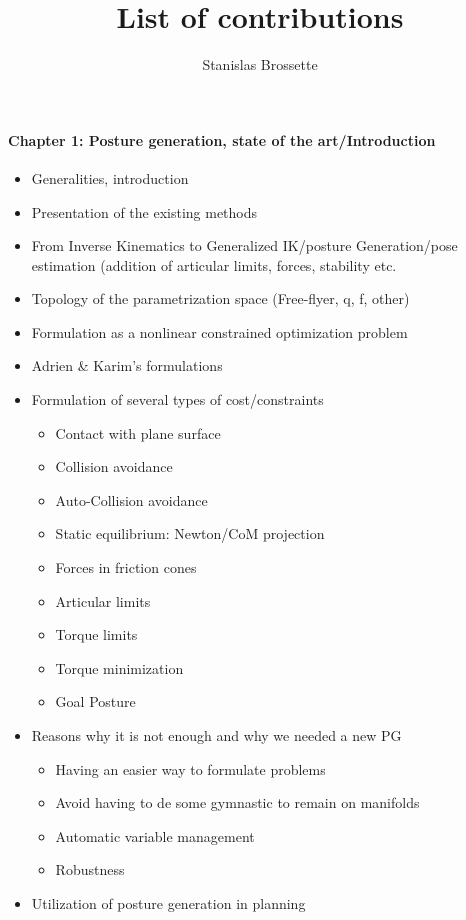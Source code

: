 \documentclass{article}
\begin{document}
\title{List of contributions}
\author{Stanislas Brossette}

\maketitle



\paragraph {Chapter 1: Posture generation, state of the art/Introduction}
\begin{itemize}
  \item Generalities, introduction
  \item Presentation of the existing methods
  \item From Inverse Kinematics to Generalized IK/posture Generation/pose estimation (addition of articular limits, forces, stability etc.
  \item Topology of the parametrization space (Free-flyer, q, f, other)
  \item Formulation as a nonlinear constrained optimization problem
  \item Adrien \& Karim's formulations
  \item Formulation of several types of cost/constraints
  \begin{itemize}
    \item Contact with plane surface
    \item Collision avoidance
    \item Auto-Collision avoidance
    \item Static equilibrium: Newton/CoM projection
    \item Forces in friction cones
    \item Articular limits
    \item Torque limits
    \item Torque minimization
    \item Goal Posture
  \end{itemize}
  \item Reasons why it is not enough and why we needed a new PG
    \begin{itemize}
      \item Having an easier way to formulate problems
      \item Avoid having to de some gymnastic to remain on manifolds
      \item Automatic variable management
      \item Robustness
    \end{itemize}
  \item Utilization of posture generation in planning
\end{itemize}
\end{document}
